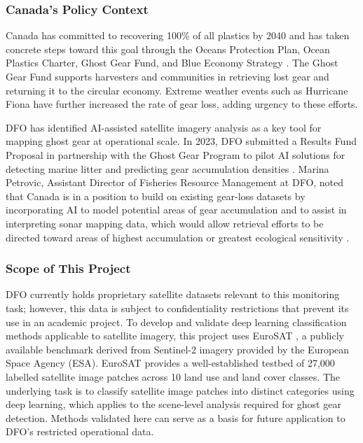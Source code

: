 \documentclass[12pt, letterpaper]{article}
\begin{document}
\subsubsection*{Canada's Policy Context}

Canada has committed to recovering 100\% of all plastics by 2040 and has taken
concrete steps toward this goal through the Oceans Protection Plan, Ocean Plastics Charter, Ghost Gear Fund, and Blue Economy Strategy \cite{dfopsdc2023}. The Ghost Gear Fund supports harvesters and communities in retrieving lost gear and returning it to the circular economy. Extreme weather events such as Hurricane Fiona have further increased the rate of gear loss, adding urgency to these efforts.

DFO has identified AI-assisted satellite imagery analysis as a key tool for mapping ghost gear at operational scale. In 2023, DFO submitted a Results Fund Proposal in partnership with the Ghost Gear Program to pilot AI solutions for detecting marine litter and predicting gear accumulation densities \cite{dfopsdc2023}. Marina Petrovic, Assistant Director of Fisheries Resource Management at DFO, noted that Canada is in a position to build on existing gear-loss datasets by incorporating AI to model potential areas of gear accumulation and to assist in interpreting sonar mapping data, which would allow retrieval efforts to be directed toward areas of highest accumulation or greatest ecological sensitivity \cite{dfopsdc2023}.

\subsubsection*{Scope of This Project}

DFO currently holds proprietary satellite datasets relevant to this monitoring task; however, this data is subject to confidentiality restrictions that prevent its use in an academic project. To develop and validate deep learning classification methods applicable to satellite imagery, this project uses EuroSAT \cite{helber2019eurosat}, a publicly available benchmark derived from Sentinel-2 imagery provided by the European Space Agency (ESA). EuroSAT provides a well-established testbed of 27,000 labelled
satellite image patches across 10 land use and land cover classes. The underlying task is to classify satellite image patches into distinct categories using deep learning, which applies to the scene-level analysis required for ghost gear detection.
Methods validated here can serve as a basis for future application to DFO's
restricted operational data.
\end{document}
